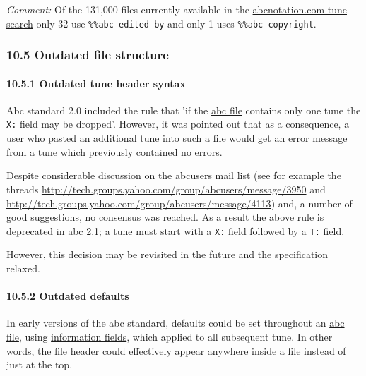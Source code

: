 \documentclass[oneside]{book}
\let\oldparagraph\paragraph
\renewcommand{\paragraph}[1]{\oldparagraph{#1}\mbox{}}
\begin{document}
\emph{Comment:} Of the 131,000 files currently available in the
\href{http://abcnotation.com/search}{abcnotation.com tune search} only
32 use \texttt{\%\%abc-edited-by} and only 1 uses
\texttt{\%\%abc-copyright}.

\hypertarget{outdated_file_structure}{\subsubsection{10.5 Outdated file
structure}\label{outdated_file_structure}}

\hypertarget{outdated_tune_header_syntax}{\paragraph{10.5.1 Outdated
tune header syntax}\label{outdated_tune_header_syntax}}

Abc standard 2.0 included the rule that 'if the
\protect\hyperlink{abc_file_definition}{abc file} contains only one tune
the \texttt{X:} field may be dropped'. However, it was pointed out that
as a consequence, a user who pasted an additional tune into such a file
would get an error message from a tune which previously contained no
errors.

Despite considerable discussion on the abcusers mail list (see for
example the threads
\url{http://tech.groups.yahoo.com/group/abcusers/message/3950} and
\url{http://tech.groups.yahoo.com/group/abcusers/message/4113}) and, a
number of good suggestions, no consensus was reached. As a result the
above rule is \protect\hyperlink{outdated_syntax}{deprecated} in abc
2.1; a tune must start with a \texttt{X:} field followed by a
\texttt{T:} field.

However, this decision may be revisited in the future and the
specification relaxed.

\hypertarget{outdated_defaults}{\paragraph{10.5.2 Outdated
defaults}\label{outdated_defaults}}

In early versions of the abc standard, defaults could be set throughout
an \protect\hyperlink{abc_file_definition}{abc file}, using
\protect\hyperlink{information_field_definition}{information fields},
which applied to all subsequent tune. In other words, the
\protect\hyperlink{file_header_definition}{file header} could
effectively appear anywhere inside a file instead of just at the top.
\end{document}
